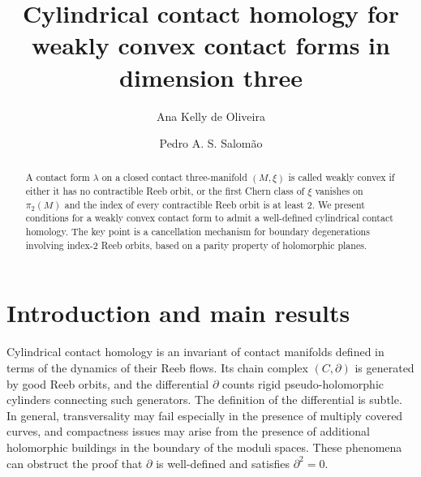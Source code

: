 \documentclass{amsart}
\begin{document}
\title{Cylindrical contact homology for weakly convex  contact forms in dimension three}

\author[Ana Kelly de Oliveira]{Ana Kelly de Oliveira} 
\address{Ana Kelly de Oliveira, Shenzhen International Center for Mathematics, Southern University of Science and Technology, Shenzhen, China}

\author[Pedro A. S. Salom\~ao]{Pedro A. S. Salom\~ao}
\address{Pedro A. S. Salom\~ao, Shenzhen International Center for Mathematics, Southern University of Science and Technology, Shenzhen, China}

\date{}

\begin{abstract}
A contact form $\lambda$ on a closed contact three-manifold $(M,\xi)$ is called weakly convex if either it has no contractible Reeb orbit, or the first Chern class of $\xi$ vanishes on $\pi_2(M)$  and the index of every contractible Reeb orbit is at least $2$. We present conditions for a weakly convex contact form to admit a well-defined cylindrical contact homology. The key point is a cancellation mechanism for boundary degenerations involving 
index-2 Reeb orbits, based on a parity property of holomorphic planes. 
\end{abstract}

\maketitle




\tableofcontents


\section{Introduction and main results}

Cylindrical contact homology is an invariant of contact manifolds
defined in terms of the dynamics of their Reeb flows. Its chain complex
$(C,\partial)$ is generated by good Reeb orbits, and the differential
$\partial$ counts rigid pseudo-holomorphic
cylinders connecting such generators.
The definition of the differential is subtle. In general, transversality
may fail especially in the presence of multiply covered curves, and compactness issues may arise
from the presence of additional holomorphic buildings in the boundary of
the moduli spaces. These phenomena can obstruct the proof that
$\partial$ is well-defined and satisfies $\partial^2=0$. 
\end{document}

